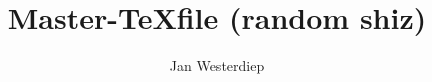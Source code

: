 \documentclass[11pt]{amsart}
\theoremstyle{definition}
\begin{document}
\title{Master-\TeX file (random shiz)}
\author{Jan Westerdiep}
\maketitle


\end{document}
